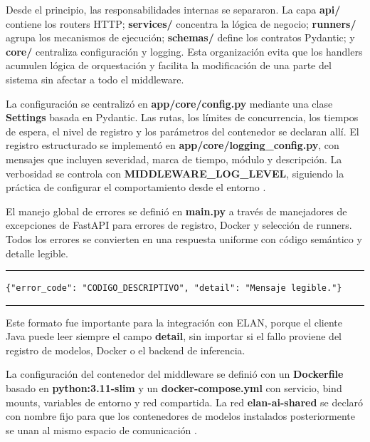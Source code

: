 Desde el principio, las responsabilidades internas se separaron. La capa \textbf{api/} contiene los routers HTTP; \textbf{services/} concentra la lógica de negocio; \textbf{runners/} agrupa los mecanismos de ejecución; \textbf{schemas/} define los contratos Pydantic; y \textbf{core/} centraliza configuración y logging. Esta organización evita que los handlers acumulen lógica de orquestación y facilita la modificación de una parte del sistema sin afectar a todo el middleware.

La configuración se centralizó en \textbf{app/core/config.py} mediante una clase \textbf{Settings} basada en Pydantic. Las rutas, los límites de concurrencia, los tiempos de espera, el nivel de registro y los parámetros del contenedor se declaran allí. El registro estructurado se implementó en \textbf{app/core/logging\_config.py}, con mensajes que incluyen severidad, marca de tiempo, módulo y descripción. La verbosidad se controla con \textbf{MIDDLEWARE\_LOG\_LEVEL}, siguiendo la práctica de configurar el comportamiento desde el entorno \cite{python_logging}.

El manejo global de errores se definió en \textbf{main.py} a través de manejadores de excepciones de FastAPI para errores de registro, Docker y selección de runners. Todos los errores se convierten en una respuesta uniforme con código semántico y detalle legible.

\begin{center}
\begin{minipage}{0.85\textwidth}
\hrule
\vspace{0.12cm}
\small
\begin{Verbatim}[baselinestretch=0.82]
{"error_code": "CODIGO_DESCRIPTIVO", "detail": "Mensaje legible."}
\end{Verbatim}
\vspace{0.05cm}
\hrule

\label{lst:error_response}
\end{minipage}
\end{center}

Este formato fue importante para la integración con ELAN, porque el cliente Java puede leer siempre el campo \textbf{detail}, sin importar si el fallo proviene del registro de modelos, Docker o el backend de inferencia.

La configuración del contenedor del middleware se definió con un \textbf{Dockerfile} basado en \textbf{python:3.11-slim} y un \textbf{docker-compose.yml} con servicio, bind mounts, variables de entorno y red compartida. La red \textbf{elan-ai-shared} se declaró con nombre fijo para que los contenedores de modelos instalados posteriormente se unan al mismo espacio de comunicación \cite{docker2026overview}.

